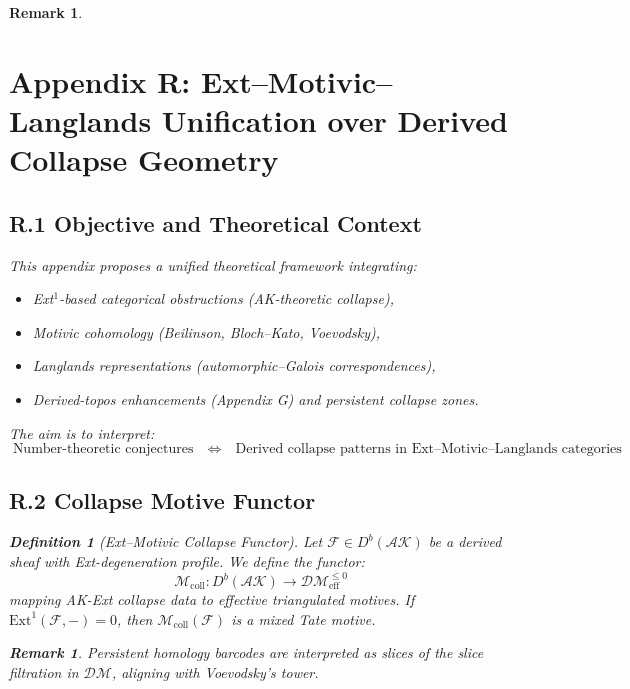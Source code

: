 \documentclass[11pt]{article}
\newtheorem{definition}[theorem]{Definition}
\newtheorem{remark}[theorem]{Remark}
\begin{document}
\begin{remark}

\section*{Appendix R: Ext–Motivic–Langlands Unification over Derived Collapse Geometry}

\subsection*{R.1 Objective and Theoretical Context}

This appendix proposes a unified theoretical framework integrating:

\begin{itemize}
  \item Ext$^1$-based categorical obstructions (AK-theoretic collapse),
  \item Motivic cohomology (Beilinson, Bloch–Kato, Voevodsky),
  \item Langlands representations (automorphic–Galois correspondences),
  \item Derived-topos enhancements (Appendix G) and persistent collapse zones.
\end{itemize}

The aim is to interpret:
\[
\boxed{
  \text{Number-theoretic conjectures} \quad \Longleftrightarrow \quad
  \text{Derived collapse patterns in Ext–Motivic–Langlands categories}
}
\]

\subsection*{R.2 Collapse Motive Functor}

\begin{definition}[Ext–Motivic Collapse Functor]
Let \( \mathcal{F} \in D^b(\mathcal{AK}) \) be a derived sheaf with Ext-degeneration profile.  
We define the functor:
\[
\mathcal{M}_{\mathrm{coll}} : D^b(\mathcal{AK}) \to \mathcal{DM}_{\mathrm{eff}}^{\leq 0}
\]
mapping AK-Ext collapse data to effective triangulated motives.  
If \( \mathrm{Ext}^1(\mathcal{F}, -) = 0 \), then \( \mathcal{M}_{\mathrm{coll}}(\mathcal{F}) \) is a mixed Tate motive.
\end{definition}

\begin{remark}
Persistent homology barcodes are interpreted as slices of the slice filtration in \( \mathcal{DM} \), aligning with Voevodsky’s tower.
\end{remark}


\end{remark}
\end{document}
